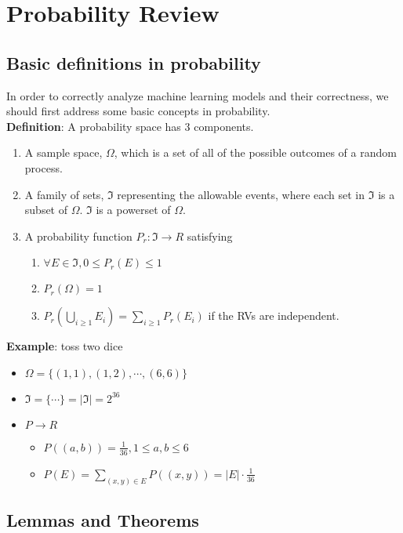 \documentclass[12pt]{article}
\newcommand{\skln}{\\[\baselineskip]}
\begin{document}
\section{Probability Review}

\subsection{Basic definitions in probability}

In order to correctly analyze machine learning models and their correctness, we should first address some basic concepts in probability.
\skln
\textbf{Definition}: A probability space has 3 components.
\begin{enumerate}[noitemsep]
\item A sample space, $\Omega$, which is a set of all of the possible outcomes of a random process.
\item A family of sets, $\Im$ representing the allowable events, where each set in $\Im$ is a subset of $\Omega$. $\Im$ is a powerset of $\Omega$.
\item A probability function $P_r: \Im \rightarrow R$ satisfying
\begin{enumerate}[noitemsep]
\item $\forall E \in \Im, 0 \le P_r(E) \le 1$
\item $P_r(\Omega) = 1$
\item $P_r(\bigcup\limits_{i \ge 1} E_{i}) = \sum\limits_{i \ge 1}P_r(E_i)$ if the RVs are independent.
\end{enumerate}
\end{enumerate}

\noindent \textbf{Example}: toss two dice

\begin{itemize}
\item $\Omega = \{(1, 1), (1, 2), \cdots, (6, 6)\}$
\item $\Im = \{\cdots\} = |\Im| = 2^{36}$
\item $P \rightarrow R$
\begin{itemize}
\item $P((a, b)) = \frac{1}{36}, 1 \le a, b \le 6$
\item $P(E) = \sum \limits_{(x, y) \in E} P((x, y)) = |E| \cdot \frac{1}{36}$
\end{itemize}
\end{itemize}

\subsection{Lemmas and Theorems}
\end{document}
